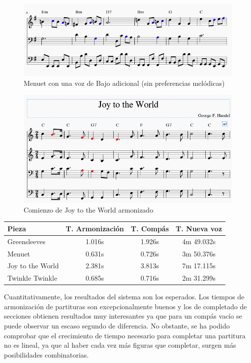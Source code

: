 \begin{figure}
    	\centering
    	\includegraphics[width=0.9\linewidth]{imagenes/evaluation/menuet_extra_bass.png}
    	\caption{Menuet con una voz de Bajo adicional (sin preferencias melódicas)}
    	\label{fig:menuet_extra_bass}
\end{figure}

\begin{figure}
    	\centering
    	\includegraphics[width=0.8\linewidth]{imagenes/evaluation/joy_harm.png}
    	\caption{Comienzo de Joy to the World armonizado}
    	\label{fig:joy_harm}
\end{figure}



\begin{center}
	\begin{tabular}{ | l | c | c | c | }
		\hline
		Pieza 			& T. Armonización 	& T. Compás & T. Nueva voz \\ \hline \hline
		Greensleeves 	& 1.016s 			& 1.926s	& 4m 49.032s \\ \hline
		Menuet 			& 0.631s 			& 0.726s 	& 3m 50.376s \\ \hline
		Joy to the World& 2.381s 			& 3.813s	& 7m 17.115s \\ \hline
		Twinkle Twinkle & 0.685s 			& 0.716s 	& 2m 31.299s \\ \hline
	\end{tabular}
\end{center}

Cuantitativamente, los resultados del sistema son los esperados. Los tiempos de armonización de partituras son excepcionalmente buenos y los de completado de secciones obtienen resultados muy interesantes ya que para un compás vacío se puede observar un escaso segundo de diferencia. No obstante, se ha podido comprobar que el crecimiento de tiempo necesario para completar una partitura no es lineal, ya que al haber cada vez más figuras que completar, surgen más posibilidades combinatorias.

